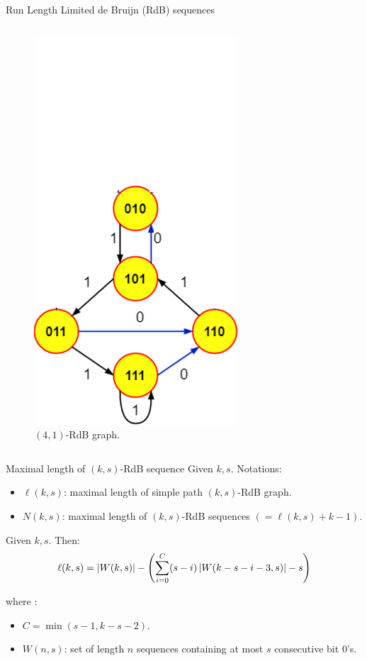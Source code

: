\begin{frame}{Run Length Limited de Bruijn (RdB) sequences}
\begin{overprint}
\begin{columns}
{\begin{column}{0.33\textwidth}
\begin{figure}[htbp]
                        \includegraphics[scale=0.26]{Images/RdB/4_1_RdB.png}
                        \caption{$(4,1)$-RdB graph.}
                        \label{fig:RdB_4_1}
                    \end{figure}
                \end{column}
            }
        \end{columns}
    \end{overprint}
    
    
\end{frame}

\begin{frame}{Maximal length of $(k,s)$-RdB sequence}
    Given $k,s$. Notations:
    \begin{itemize}
        \item $\ell(k,s)$: maximal length of simple path $(k,s)$-RdB graph.
        \item $N(k,s)$: maximal length of $(k,s)$-RdB sequences $(=\ell(k,s)+k-1)$.
    \end{itemize}
    \begin{theorem}
        Given $k,s$. Then:
        \begin{align}
            \ell(k,s) = \left \lvert W(k,s) \right \rvert - \left(\sum_{i=0}^{C}(s-i)\left \lvert W(k-s-i-3,s) \right \rvert-s\right)
        \end{align}
    \end{theorem}
    where :
    \begin{itemize}
        \item $C=\min(s-1,k-s-2)$.
        \item $W(n,s)$: set of length $n$ sequences containing at most $s$ consecutive bit $0$'s. 
    \end{itemize}
\end{frame}

